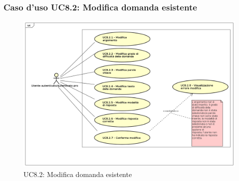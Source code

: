 	\subsubsection{Caso d'uso UC8.2: Modifica domanda esistente}
	\label{UC8.2}
	\begin{figure}[h]
		\centering
			\includegraphics[scale=0.45,keepaspectratio]{UML/UC8_2.png}
		\caption{UC8.2: Modifica domanda esistente}
	\end{figure}
	\FloatBarrier
